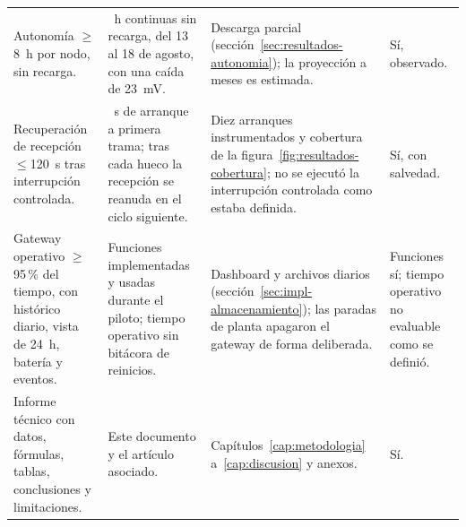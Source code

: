 \begin{longtable}{@{}>{\raggedright\arraybackslash}p{3.3cm}>{\raggedright\arraybackslash}p{4.1cm}>{\raggedright\arraybackslash}p{4.3cm}>{\raggedright\arraybackslash}p{2.7cm}@{}}
Autonomía $\geq$8~h por nodo, sin recarga. & 120~h continuas sin recarga, del 13 al 18 de agosto, con una caída de 23~mV. & Descarga parcial (sección~\ref{sec:resultados-autonomia}); la proyección a meses es estimada. & Sí, observado. \\
Recuperación de recepción $\leq$120~s tras interrupción controlada. & 2.279~s de arranque a primera trama; tras cada hueco la recepción se reanuda en el ciclo siguiente. & Diez arranques instrumentados y cobertura de la figura~\ref{fig:resultados-cobertura}; no se ejecutó la interrupción controlada como estaba definida. & Sí, con salvedad. \\
Gateway operativo $\geq$95\,\% del tiempo, con histórico diario, vista de 24~h, batería y eventos. & Funciones implementadas y usadas durante el piloto; tiempo operativo sin bitácora de reinicios. & Dashboard y archivos diarios (sección~\ref{sec:impl-almacenamiento}); las paradas de planta apagaron el gateway de forma deliberada. & Funciones sí; tiempo operativo no evaluable como se definió. \\
Informe técnico con datos, fórmulas, tablas, conclusiones y limitaciones. & Este documento y el artículo asociado. & Capítulos~\ref{cap:metodologia} a~\ref{cap:discusion} y anexos. & Sí. \\
\end{longtable}
\endgroup

